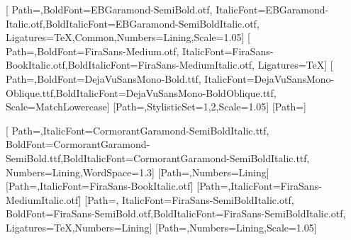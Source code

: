 \usepackage{fontspec}
\usepackage[math-style=TeX,bold-style=TeX]{unicode-math}
  {\def\ocFontPath{../common/fonts/}}
  {\def\ocFontPath{common/fonts/}}
\def\ocScale{1.05}
\setmainfont{EBGaramond-Regular.otf}[
  Path=\ocFontPath,BoldFont=EBGaramond-SemiBold.otf,
  ItalicFont=EBGaramond-Italic.otf,BoldItalicFont=EBGaramond-SemiBoldItalic.otf,
  Ligatures={TeX,Common},Numbers=Lining,Scale=\ocScale]
\setsansfont{FiraSans-Book.otf}[
  Path=\ocFontPath,BoldFont=FiraSans-Medium.otf,
  ItalicFont=FiraSans-BookItalic.otf,BoldItalicFont=FiraSans-MediumItalic.otf,
  Ligatures=TeX]
\setmonofont{DejaVuSansMono.ttf}[
  Path=\ocFontPath,BoldFont=DejaVuSansMono-Bold.ttf,
  ItalicFont=DejaVuSansMono-Oblique.ttf,BoldItalicFont=DejaVuSansMono-BoldOblique.ttf,
  Scale=MatchLowercase]
[Path=\ocFontPath,StylisticSet={1,2},Scale=\ocScale]
\renewcommand{\boldsymbol}[1]{\symbf{#1}}
\def\blacksquare{\mdlgblksquare}
\newfontfamily{}[Path=\ocFontPath]

\newfontfamily{}[
  Path=\ocFontPath,ItalicFont=CormorantGaramond-SemiBoldItalic.ttf,
  BoldFont=CormorantGaramond-SemiBold.ttf,BoldItalicFont=CormorantGaramond-SemiBoldItalic.ttf,
  Numbers=Lining,WordSpace=1.3]
\newfontfamily{}[Path=\ocFontPath,Numbers=Lining]
\newfontfamily{}[Path=\ocFontPath,ItalicFont=FiraSans-BookItalic.otf]
\newfontfamily{}[Path=\ocFontPath,ItalicFont=FiraSans-MediumItalic.otf]
\newfontfamily{}[Path=\ocFontPath,
  ItalicFont=FiraSans-SemiBoldItalic.otf,
  BoldFont=FiraSans-SemiBold.otf,BoldItalicFont=FiraSans-SemiBoldItalic.otf,
  Ligatures=TeX,Numbers=Lining]
\newfontfamily{}[Path=\ocFontPath,Numbers=Lining,Scale=\ocScale]
\let\ocCoverDisplay\ocDisplay

